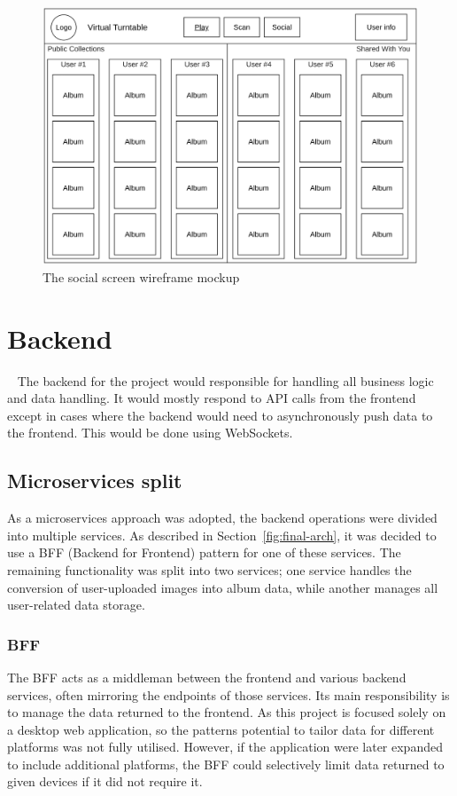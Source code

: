 \begin{figure} [H]
    \centering
    \includegraphics[width=0.6\linewidth]{figures/social_screen_mockup.png}
    \caption{The social screen wireframe mockup}
    \label{fig:social_screen_mockup}
\end{figure}

\section{Backend}~\label{sec:backend-design}
The backend for the project would responsible for handling all business logic and data handling. It would mostly respond to API calls from the frontend except in cases where the backend would need to asynchronously push data to the frontend. This would be done using WebSockets.

\subsection{Microservices split}
As a microservices approach was adopted, the backend operations were divided into multiple services. As described in Section~\ref{fig:final-arch}, it was decided to use a BFF (Backend for Frontend) pattern for one of these services. The remaining functionality was split into two services; one service handles the conversion of user-uploaded images into album data, while another manages all user-related data storage.

\subsubsection{BFF}
The BFF acts as a middleman between the frontend and various backend services, often mirroring the endpoints of those services. Its main responsibility is to manage the data returned to the frontend. As this project is focused solely on a desktop web application, so the patterns potential to tailor data for different platforms was not fully utilised. However, if the application were later expanded to include additional platforms, the BFF could selectively limit data returned to given devices if it did not require it.

